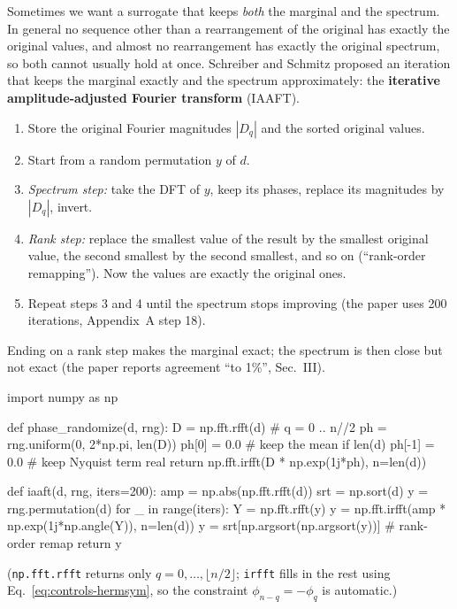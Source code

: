 Sometimes we want a surrogate that keeps \emph{both} the marginal and the spectrum. In general no sequence other than a rearrangement of the original has exactly the original values, and almost no rearrangement has exactly the original spectrum, so both cannot usually hold at once. Schreiber and Schmitz \cite{schreiber} proposed an iteration that keeps the marginal exactly and the spectrum approximately: the \textbf{iterative amplitude-adjusted Fourier transform} (IAAFT).
\begin{enumerate}
\item Store the original Fourier magnitudes $|D_q|$ and the sorted original values.
\item Start from a random permutation $y$ of $d$.
\item \emph{Spectrum step:} take the DFT of $y$, keep its phases, replace its magnitudes by $|D_q|$, invert.
\item \emph{Rank step:} replace the smallest value of the result by the smallest original value, the second smallest by the second smallest, and so on (``rank-order remapping''). Now the values are exactly the original ones.
\item Repeat steps 3 and 4 until the spectrum stops improving (the paper uses 200 iterations, Appendix~A step 18).
\end{enumerate}
Ending on a rank step makes the marginal exact; the spectrum is then close but not exact (the paper reports agreement ``to 1\%'', Sec.~III).

\begin{pycode}
import numpy as np

def phase_randomize(d, rng):
    D = np.fft.rfft(d)                      # q = 0 .. n//2
    ph = rng.uniform(0, 2*np.pi, len(D))
    ph[0] = 0.0                             # keep the mean
    if len(d) %
        ph[-1] = 0.0                        # keep Nyquist term real
    return np.fft.irfft(D * np.exp(1j*ph), n=len(d))

def iaaft(d, rng, iters=200):
    amp = np.abs(np.fft.rfft(d))
    srt = np.sort(d)
    y = rng.permutation(d)
    for _ in range(iters):
        Y = np.fft.rfft(y)
        y = np.fft.irfft(amp * np.exp(1j*np.angle(Y)), n=len(d))
        y = srt[np.argsort(np.argsort(y))]  # rank-order remap
    return y
\end{pycode}

(\texttt{np.fft.rfft} returns only $q=0,\dots,\lfloor n/2\rfloor$; \texttt{irfft} fills in the rest using Eq.~\eqref{eq:controls-hermsym}, so the constraint $\phi_{n-q}=-\phi_q$ is automatic.)

